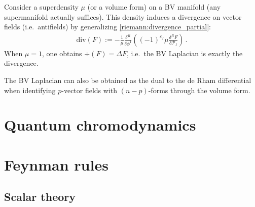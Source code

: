     \begin{property}[Divergence]
        Consider a superdensity $\mu$ (or a volume form) on a BV manifold (any supermanifold actually suffices). This density induces a divergence on vector fields (i.e.~antifields) by generalizing \cref{riemann:divergence_partial}:
        \begin{gather}
            \mathrm{div}(F) := -\frac{1}{\mu}\frac{\delta^R}{\delta\phi^I}\left((-1)^{\varepsilon_I}\mu\frac{\delta^RF}{\delta\mathcal{P}_I}\right)\,.
        \end{gather}
        When $\mu=1$, one obtains $\div(F)=\Delta F$, i.e.~the BV Laplacian is exactly the divergence.
    \end{property}
    \begin{remark}
        The BV Laplacian can also be obtained as the dual to the de Rham differential when identifying $p$-vector fields with $(n-p)$-forms through the volume form.
    \end{remark}

\section{Quantum chromodynamics}\label{section:qcd}



\section{Feynman rules}
\subsection{Scalar theory}

